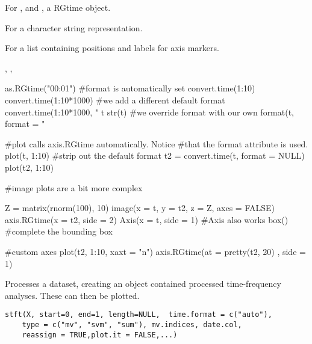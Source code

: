 \documentclass[a4paper]{book}
\begin{document}
%
\begin{Value}
For ,  and , a RGtime object.

For  a character string representation.

For  a list containing positions and labels for axis markers.
\end{Value}
%
\begin{SeeAlso}\relax
{}, , 
\end{SeeAlso}
%
\begin{Examples}
\begin{ExampleCode}
as.RGtime("00:01")
#format is automatically set
convert.time(1:10)
convert.time(1:10*1000)
#we add a different default format
convert.time(1:10*1000, "%
t
str(t)
#we override format with our own
format(t, format = "%

#plot calls axis.RGtime automatically. Notice
#that the format attribute is used.
plot(t, 1:10)
#strip out the default format
t2 = convert.time(t, format = NULL)
plot(t2, 1:10)

#image plots are a bit more complex

Z = matrix(rnorm(100), 10)
image(x = t, y = t2, z = Z, axes = FALSE)
axis.RGtime(x = t2, side = 2)
Axis(x = t, side = 1) #Axis also works
box() #complete the bounding box

#custom axes
plot(t2, 1:10, xaxt = "n")
axis.RGtime(at = pretty(t2, 20) , side = 1)
\end{ExampleCode}
\end{Examples}
%
\begin{Description}\relax
Processes a dataset, creating an object contained processed time-frequency analyses. These can then be plotted.
\end{Description}
%
\begin{Usage}
\begin{verbatim}
stft(X, start=0, end=1, length=NULL,  time.format = c("auto"), 
    type = c("mv", "svm", "sum"), mv.indices, date.col, 
    reassign = TRUE,plot.it = FALSE,...)
\end{verbatim}
\end{Usage}
%
\end{document}
